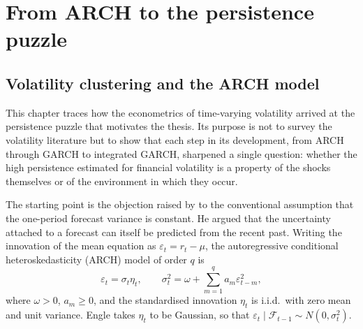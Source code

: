 
\chapter{From ARCH to the persistence puzzle}\label{ch:persistence}

\section{Volatility clustering and the ARCH model}\label{sec:arch}

This chapter traces how the econometrics of time-varying volatility arrived at the persistence puzzle that motivates the thesis. Its purpose is not to survey the volatility literature but to show that each step in its development, from ARCH through GARCH to integrated GARCH, sharpened a single question: whether the high persistence estimated for financial volatility is a property of the shocks themselves or of the environment in which they occur.

The starting point is the objection raised by \textcite{engle1982} to the conventional assumption that the one-period forecast variance is constant. He argued that the uncertainty attached to a forecast can itself be predicted from the recent past. Writing the innovation of the mean equation as $\varepsilon_t = r_t - \mu$, the autoregressive conditional heteroskedasticity (ARCH) model of order $q$ is
\begin{equation}\label{eq:arch}
  \varepsilon_t = \sigma_t \eta_t, \qquad
  \sigma_t^2 = \omega + \sum_{m=1}^{q} a_m \varepsilon_{t-m}^2 ,
\end{equation}
where $\omega > 0$, $a_m \ge 0$, and the standardised innovation $\eta_t$ is i.i.d.\ with zero mean and unit variance. Engle takes $\eta_t$ to be Gaussian, so that $\varepsilon_t \mid \mathcal{F}_{t-1} \sim N(0, \sigma_t^2)$.

